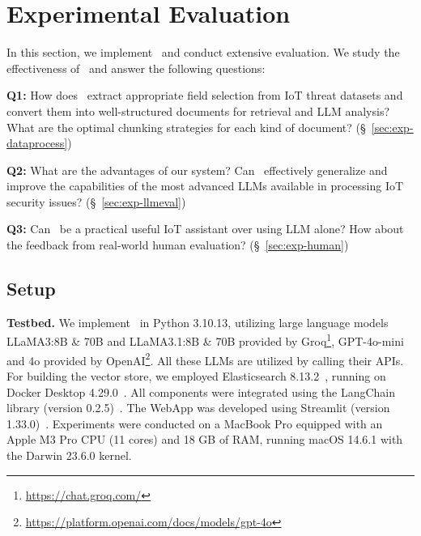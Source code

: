 \section{Experimental Evaluation}\label{sec:experiment}

In this section, we implement \chatiot\ and conduct extensive evaluation. 
We study the effectiveness of \chatiot\ and answer the following questions:

\noindent \textbf{Q1:} How does \datakit\ extract appropriate field selection from IoT threat datasets and convert them into well-structured documents for retrieval and LLM analysis?
What are the optimal chunking strategies for each kind of document? (\S~\ref{sec:exp-dataprocess})

\noindent \textbf{Q2:} What are the advantages of our system? Can \chatiot\ effectively generalize and improve the capabilities of the most advanced LLMs available in processing IoT security issues? (\S~\ref{sec:exp-llmeval})

\noindent \textbf{Q3:} Can \chatiot\ be a practical useful IoT assistant over using LLM alone? How about the feedback from real-world human evaluation? (\S~\ref{sec:exp-human})


\subsection{Setup}
\noindent \textbf{Testbed.}
We implement \chatiot\ in Python 3.10.13, utilizing large language models LLaMA3:8B \& 70B and LLaMA3.1:8B \& 70B provided by Groq\footnote{\scriptsize \url{https://chat.groq.com/}}, GPT-4o-mini and 4o provided by OpenAI\footnote{\scriptsize \url{https://platform.openai.com/docs/models/gpt-4o}}. All these LLMs are utilized by calling their APIs.
For building the vector store, we employed Elasticsearch 8.13.2~\cite{elasticsearch2018elasticsearch}, running on Docker Desktop 4.29.0~\cite{docker-desktop}. 
All components were integrated using the LangChain library (version 0.2.5)~\cite{langchain2024}. 
The WebApp was developed using Streamlit (version 1.33.0)~\cite{streamlit}. 
Experiments were conducted on a MacBook Pro equipped with an Apple M3 Pro CPU (11 cores) and 18 GB of RAM, running macOS 14.6.1 with the Darwin 23.6.0 kernel.

